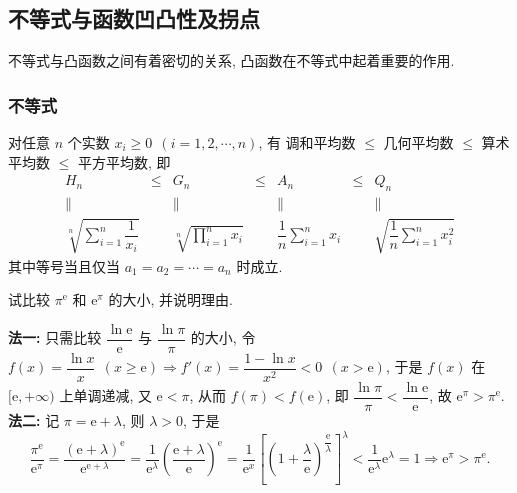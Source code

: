 \subsection{不等式与函数凹凸性及拐点}

不等式与凸函数之间有着密切的关系, 凸函数在不等式中起着重要的作用.

\subsubsection{不等式}

\begin{theorem}[均值不等式]
    对任意 $n$ 个实数 $x_i\geqslant 0~~(i=1,2,\cdots,n)$, 有\label{meanInequality}
    调和平均数 $\leqslant$ 几何平均数 $\leqslant$ 算术平均数 $\leqslant$ 平方平均数, 即
    $$\begin{matrix}
            H_n                                                    & \leqslant & G_n                                                    & \leqslant & A_n       & \leqslant & Q_n       \\
            \parallel                                              &           & \parallel                                              &           & \parallel &           & \parallel \\
            \sqrt[n]{\displaystyle \sum_{i=1}^{n}\dfrac{1}{x_i}  } &           & \sqrt[n]{\displaystyle \prod _{i=1}^n x_i}             &           &
            \displaystyle \dfrac{1}{n}\sum_{i=1}^{n}x_i            &           & \sqrt{\displaystyle \dfrac{1}{n}\sum_{i=1}^{n}x_i^2  }
        \end{matrix}$$
    其中等号当且仅当 $a_1=a_2=\cdots=a_n$ 时成立.
\end{theorem}

\begin{example}
    试比较 $\pi^{\mathrm{e}}$ 和 $\mathrm{e}^\pi$ 的大小, 并说明理由.
\end{example}
\begin{solution}
    \textbf{法一: }只需比较 $\dfrac{\ln \mathrm{e}}{\mathrm{e}}$ 与 $\dfrac{\ln\pi}{\pi}$ 的大小, 
    令 $f(x)=\dfrac{\ln x}{x}~~(x\geqslant \mathrm{e})\Rightarrow f'(x)=\dfrac{1-\ln x}{x^2}<0~~(x>\mathrm{e})$, 于是 $f(x)$ 在 $[\mathrm{e},+\infty)$ 上单调递减, 
    又 $\mathrm{e}<\pi$, 从而 $f(\pi)<f(\mathrm{e})$, 即 $\dfrac{\ln\pi}{\pi}<\dfrac{\ln \mathrm{e}}{\mathrm{e}}$, 故 $\mathrm{e}^\pi>\pi^{\mathrm{e}}.$\\
    \textbf{法二: }记 $\pi=\mathrm{e}+\lambda$, 则 $\lambda>0$, 于是
    $$\dfrac{\pi ^{\mathrm{e}}}{\mathrm{e}^{\pi }}=\dfrac{\left( \mathrm{e}+\lambda \right) ^{\mathrm{e}}}{\mathrm{e}^{\mathrm{e}+\lambda }}=\dfrac{1}{\mathrm{e}^{\lambda }}\left( \dfrac{\mathrm{e}+\lambda }{\mathrm{e}}\right) ^{\mathrm{e}}=\dfrac{1}{\mathrm{e}^{x}}\left[ \left( 1+\dfrac{\lambda }{\mathrm{e}}\right) ^{\dfrac{\mathrm{e}}{\lambda }}\right] ^{\lambda } <\dfrac{1}{\mathrm{e}^{\lambda }}\mathrm{e}^{\lambda }=1\Rightarrow\mathrm{e}^\pi>\pi^{\mathrm{e}}.$$
\end{solution}

